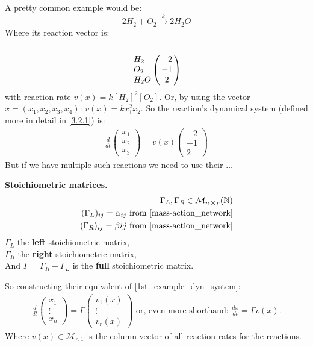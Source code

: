 A pretty common example would be:
\[
	2H_2 + O_2 \xrightarrow{k} 2H_2O
\]
Where its reaction vector is:
\[
	\bordermatrix{\cr \cr
		H_2 & -2 \cr
		O_2 & -1 \cr
		H_2O & 2 \cr
	}
\]
with reaction rate $v(x) = k[H_2]^2[O_2]$. Or, by using the vector $x=(x_1, x_2, x_3, x_4)$: $v(x) = k x_1^2 x_2$.
So the reaction's dynamical system (defined more in detail in \ref{3.2.1}) is:
\begin{align}\label{1st_example_dyn_system}
	\frac{d}{dt}
	\begin{pmatrix*}
		x_1 \\
		x_2 \\
		x_3
	\end{pmatrix*} =
	v(x)
	\begin{pmatrix}
		-2 \\
		-1 \\
		2
	\end{pmatrix}
\end{align}
But if we have multiple such reactions we need to use their $\ldots$
\begin{definition}
	\textbf{Stoichiometric matrices.}
	\begin{align*}
		\Gamma_L, \Gamma_R \in \mathcal{M}_{n \bigtimes r}(\mathbb{N}) \\
		(\Gamma_L)_{ij} = \alpha_{ij} \text{ from \ref{mass-action_network}} \\
		(\Gamma_R)_{ij} = \beta{ij} \text{ from \ref{mass-action_network}}
	\end{align*}
	$\Gamma_L$ the \textbf{left} stoichiometric matrix, \\
	$\Gamma_R$ the \textbf{right} stoichiometric matrix,\\
	And $\Gamma = \Gamma_R - \Gamma_L$ is the \textbf{full} stoichiometric matrix.
\end{definition}
So constructing their equivalent of \ref{1st_example_dyn_system}:
\begin{align}
	\frac{d}{dt}
	\begin{pmatrix*}
		x_1 \\
		\vdots \\
		x_n
	\end{pmatrix*} = \Gamma
	\begin{pmatrix*}
		v_1(x)	 \\
		\vdots \\
		v_r(x)
	\end{pmatrix*}
	\text{ or, even more shorthand:  }
	\frac{dx}{dt} = \Gamma v(x).
\end{align}
Where $v(x) \in \mathcal{M}_{r,1}$ is the column vector of all reaction rates for the reactions.